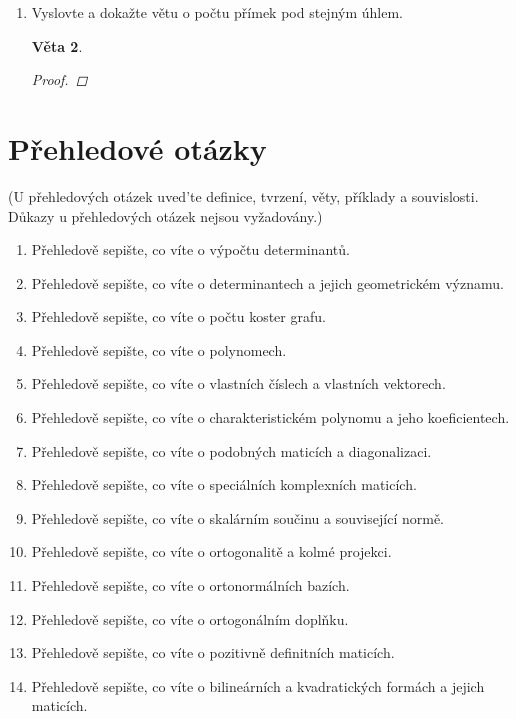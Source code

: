 \documentclass[10pt,a4paper]{article}
\theoremstyle{plain}
\newtheorem{veta}{Věta}
\begin{document}
\begin{enumerate}
\begin{veta}
\begin{proof}
\begin{enumerate}
Spor, tedy $r \ngtr s$. Symetricky $r \nless s$, tedy $r = s$. Počet $-1$ je doplněk do řádu matice, takže taky shodný pro obě matice. 
 
\end{enumerate}
\end{proof}
\end{veta}


\item Vyslovte a dokažte větu o počtu přímek pod stejným úhlem.


\begin{veta}

\begin{proof}

\end{proof}
\end{veta}


\end{enumerate}


\part{Přehledové otázky}


(U přehledových otázek uved'te definice, tvrzení, věty, příklady a souvislosti. Důkazy u přehledových otázek nejsou vyžadovány.)
\begin{enumerate}
\item Přehledově sepište, co víte o výpočtu determinantů.
\item Přehledově sepište, co víte o determinantech a jejich geometrickém významu.
\item Přehledově sepište, co víte o počtu koster grafu.
\item Přehledově sepište, co víte o polynomech.
\item Přehledově sepište, co víte o vlastních číslech a vlastních vektorech.
\item Přehledově sepište, co víte o charakteristickém polynomu a jeho koeficientech.
\item Přehledově sepište, co víte o podobných maticích a diagonalizaci.
\item Přehledově sepište, co víte o speciálních komplexních maticích.
\item Přehledově sepište, co víte o skalárním součinu a související normě.
\item Přehledově sepište, co víte o ortogonalitě a kolmé projekci.
\item Přehledově sepište, co víte o ortonormálních bazích.
\item Přehledově sepište, co víte o ortogonálním doplňku.
\item Přehledově sepište, co víte o pozitivně definitních maticích.
\item Přehledově sepište, co víte o bilineárních a kvadratických formách a jejich maticích.
\end{enumerate}
\end{document}
